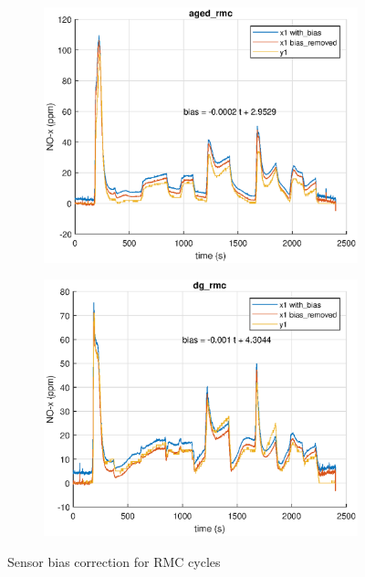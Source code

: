\begin{figure}[H]
    \begin{minipage}{0.49\textwidth}
        \begin{figure}[H]
            \includegraphics[width=\textwidth]{./figs/chi_est/aged_rmc_NOx_bias.eps}
        \end{figure}
    \end{minipage}
    \begin{minipage}{0.49\textwidth}
        \begin{figure}[H]
            \includegraphics[width=\textwidth]{./figs/chi_est/dg_rmc_NOx_bias.eps}
        \end{figure}
    \end{minipage}
        \caption{Sensor bias correction for RMC cycles}
\end{figure}

